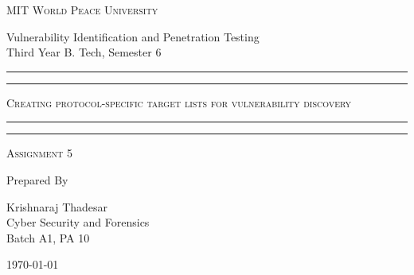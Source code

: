 \documentclass[11pt]{article}
\begin{document}
\begin{titlepage}
    \centering


    \huge\textsc{
        MIT World Peace University
    }\\

    \vspace{0.75\baselineskip} %

    \LARGE{
        Vulnerability Identification and Penetration Testing\\
        Third Year B. Tech, Semester 6
    }

    \vfill %


    \rule{\textwidth}{1.6pt}\vspace*{-\baselineskip}\vspace*{2pt}
    \rule{\textwidth}{0.6pt}
    \vspace{0.75\baselineskip} %



    \huge{\textsc{
            Creating protocol-specific target lists for vulnerability discovery
        }} \\



    \vspace{0.5\baselineskip} %
    \rule{\textwidth}{0.6pt}\vspace*{-\baselineskip}\vspace*{2.8pt}
    \rule{\textwidth}{1.6pt}

    \vspace{1\baselineskip} %


    \LARGE\textsc{
        Assignment 5
    } %
    \vfill


    Prepared By
    \vspace{0.5\baselineskip} %

    \Large{
        Krishnaraj Thadesar \\
        Cyber Security and Forensics\\
        Batch A1, PA 10
    }


    \vspace{0.5\baselineskip} %
    \today

\end{titlepage}
\end{document}

